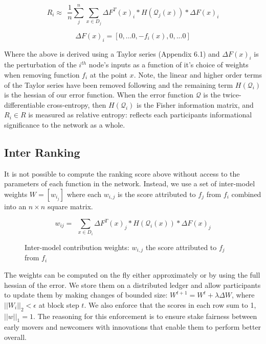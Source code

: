 \documentclass{article}
\begin{document}
\begin{equation}
R_i \approx \ \ \frac{1}{n} \sum_{j}^{n} \sum_{x \in D_j} \Delta F^T(x)_i * H(\mathcal{Q}_j(x)) * \Delta F(x)_i 
\end{equation}

\[ \Delta F (x)_i = [0, ... 0, -f_i(x), 0, ... 0] \]

Where the above is derived using a Taylor series (Appendix 6.1) and $\Delta F (x)_i$ is the {\color{blue} perturbation of the $i^{th}$ node's inputs as a function of it's choice of weights when removing function $f_i$ at the point $x$}. Note, the linear and higher order terms of the Taylor series have been removed following \cite{yu2017nisp} and the remaining term $H(\mathcal{Q}_i)$ is the hessian of our error function. When the error function $\mathcal{Q}$ is the twice-differentiable cross-entropy, then $H(\mathcal{Q}_i)$ is the Fisher information matrix, and $R_i \in R$ is measured as relative entropy: reflects each participants informational significance to the network as a whole.
\bigskip

\subsection{Inter Ranking}
\label{sec:inter-ranking}
It is not possible to compute the ranking score above without access to the parameters of each function in the network. Instead, we use a set of inter-model weights $W = [w_{i_j}]$ where each $w_{i,j}$ is the score attributed to $f_j$ from $f_i$ combined into an $n \times n$ square matrix.
\bigskip

\begin{equation}
w_{ij} = \ \ \sum_{x \in D_i} \Delta F^T(x)_j * H(\mathcal{Q}_i(x)) * \Delta F(x)_j
\end{equation}

\begin{figure}[H]
	\centering
	\hspace*{-2cm}
	
	\caption{Inter-model contribution weights: $w_{i,j}$ the score attributed to $f_j$ from $f_i$}
\end{figure}{}


The weights can be computed on the fly either approximately \cite{yu2017nisp} or by using the full hessian of the error. We store them on a distributed ledger and allow participants to update them by making changes of bounded size: $W^{t+1}= W^t + \lambda \Delta W$, where $||W_i||_2 < \epsilon$ at block step $t$. We also enforce that the scores in each row sum to 1, $||w||_1 = 1$. {\color{blue} The reasoning for this enforcement is to ensure stake fairness between early movers and newcomers with innovations that enable them to perform better overall.}
\end{document}
